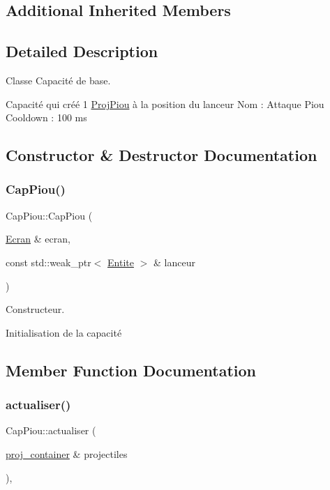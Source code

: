 \subsection*{Additional Inherited Members}


\subsection{Detailed Description}
Classe Capacité de base. 

Capacité qui créé 1 \mbox{\hyperlink{class_proj_piou}{Proj\+Piou}} à la position du lanceur Nom \+: Attaque Piou Cooldown \+: 100 ms 

\subsection{Constructor \& Destructor Documentation}
\mbox{\label{class_cap_piou_aa0c57fbd8faf4c26eec74e99f00d7af3}} 
\subsubsection{\texorpdfstring{Cap\+Piou()}{CapPiou()}}
{\footnotesize\ttfamily Cap\+Piou\+::\+Cap\+Piou (\begin{DoxyParamCaption}\item[{\mbox{\hyperlink{class_ecran}{Ecran}} \&}]{ecran,  }\item[{const std\+::weak\+\_\+ptr$<$ \mbox{\hyperlink{class_entite}{Entite}} $>$ \&}]{lanceur }\end{DoxyParamCaption})\hspace{0.3cm}{\ttfamily [explicit]}}



Constructeur. 

Initialisation de la capacité 

\subsection{Member Function Documentation}
\mbox{\label{class_cap_piou_ae566dc069b127f27cdd770f72dbdcbe4}} 
\subsubsection{\texorpdfstring{actualiser()}{actualiser()}}
{\footnotesize\ttfamily Cap\+Piou\+::actualiser (\begin{DoxyParamCaption}\item[{\mbox{\hyperlink{def__type_8h_a87980cd8ee9533e561a73e8bbc728188}{proj\+\_\+container}} \&}]{projectiles }\end{DoxyParamCaption})\hspace{0.3cm}{\ttfamily [override]}, {\ttfamily [virtual]}}



